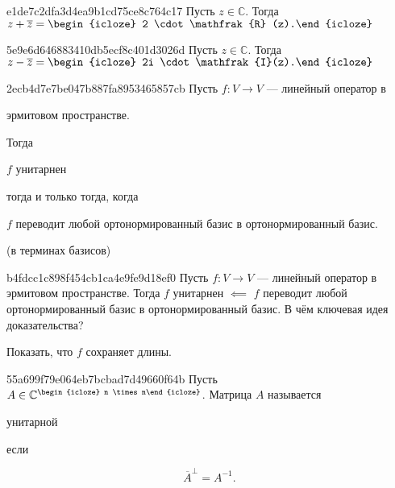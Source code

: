 \begin{note}{e1de7c2dfa3d4ea9b1cd75ce8c764c17}
    Пусть \({ z \in \mathbb C }\).
    Тогда \({ z + \overline{z} = \begin{icloze}{1}2 \cdot \mathfrak{R} (z).\end{icloze} }\)
\end{note}

\begin{note}{5e9e6d646883410db5ecf8c401d3026d}
    Пусть \({ z \in \mathbb C }\).
    Тогда \({ z - \overline{z} = \begin{icloze}{1}2i \cdot \mathfrak{I}(z).\end{icloze} }\)
\end{note}

\begin{note}{2ecb4d7e7be047b887fa8953465857cb}
    Пусть \({ f : V \to V }\) --- линейный оператор в \begin{icloze}{3}эрмитовом пространстве.\end{icloze}
    Тогда \begin{icloze}{2}\({ f }\) унитарнен\end{icloze} тогда и только тогда, когда
    \begin{icloze}{1}\({ f }\) переводит любой ортонормированный базис в ортонормированный базис.\end{icloze}

    \begin{center}
        \tiny
        (в терминах базисов)
    \end{center}
\end{note}

\begin{note}{b4fdcc1c898f454cb1ca4e9fe9d18ef0}
    Пусть \({ f : V \to V }\) --- линейный оператор в эрмитовом пространстве.
    Тогда \({ f }\) унитарнен \({ \impliedby }\)
    \({ f }\) переводит любой ортонормированный базис в ортонормированный базис.
    В чём ключевая идея доказательства?

    \begin{cloze}{1}
        Показать, что \({ f }\) сохраняет длины.
    \end{cloze}
\end{note}

\begin{note}{55a699f79e064eb7bcbad7d49660f64b}
    Пусть \({ A \in \mathbb C^{\begin{icloze}{3}n \times n\end{icloze}} }\).
    Матрица \({ A }\) называется \begin{icloze}{2}унитарной\end{icloze} если
    \begin{icloze}{1}
        \[
            \overline{A}^{\perp} = A^{-1}.
        \]
    \end{icloze}
\end{note}

